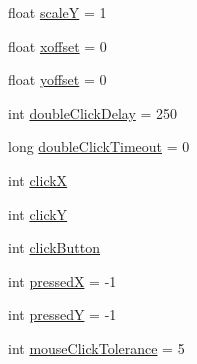 \begin{DoxyCompactItemize}
\item 
float \mbox{\hyperlink{classorg_1_1newdawn_1_1slick_1_1_input_a1a1f2fde64f0947353a3b1c2ea09d42c}{scaleY}} = 1
\item 
float \mbox{\hyperlink{classorg_1_1newdawn_1_1slick_1_1_input_a51d996d444321f25398b39993bbe9dd2}{xoffset}} = 0
\item 
float \mbox{\hyperlink{classorg_1_1newdawn_1_1slick_1_1_input_a83f7e89a50859707a59db3464a2d98a8}{yoffset}} = 0
\item 
int \mbox{\hyperlink{classorg_1_1newdawn_1_1slick_1_1_input_a42e5b78568d9726aae78751b4b9bac3f}{double\+Click\+Delay}} = 250
\item 
long \mbox{\hyperlink{classorg_1_1newdawn_1_1slick_1_1_input_a5890660cb280ce9aa2c5fc29846901b0}{double\+Click\+Timeout}} = 0
\item 
int \mbox{\hyperlink{classorg_1_1newdawn_1_1slick_1_1_input_a632aa28f148933d7415c689fa25a7329}{clickX}}
\item 
int \mbox{\hyperlink{classorg_1_1newdawn_1_1slick_1_1_input_afa80ac9c5eee8d3accdc97ad00c6ca12}{clickY}}
\item 
int \mbox{\hyperlink{classorg_1_1newdawn_1_1slick_1_1_input_a386f45644fd888480c6f0b2c71c8e530}{click\+Button}}
\item 
int \mbox{\hyperlink{classorg_1_1newdawn_1_1slick_1_1_input_ae1a1789dc88f9d6e06d9ef4fc1aa491d}{pressedX}} = -\/1
\item 
int \mbox{\hyperlink{classorg_1_1newdawn_1_1slick_1_1_input_a27c453e1efd0e5fcfba782da66929dde}{pressedY}} = -\/1
\item 
int \mbox{\hyperlink{classorg_1_1newdawn_1_1slick_1_1_input_a8a57b217ce798c9495cefe02853ad65a}{mouse\+Click\+Tolerance}} = 5
\end{DoxyCompactItemize}
